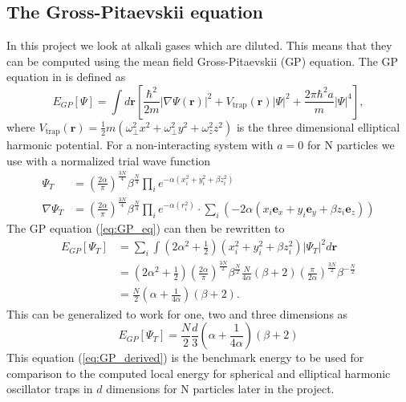 \documentclass[12pt,a4paper,english]{article}
\begin{document}
\subsection{The Gross-Pitaevskii equation}
\label{subsect:GP_eq}
In this project we look at alkali gases which are diluted. This means that they can be computed using the mean field Gross-Pitaevskii (GP) equation. The GP equation in \citet{dubois2001bose} is defined as
\begin{equation}
\label{eq:GP_eq}
E_{GP}[\Psi]=\int d\textbf{r}\left[\frac{\hbar^2}{2m}|\nabla\Psi(\textbf{r})|^2+V_{\text{trap}}(\textbf{r})|\Psi|^2+\frac{2\pi\hbar^2a}{m}|\Psi|^4\right],
\end{equation}
where $V_{\text{trap}}(\textbf{r})=\frac{1}{2}m(\omega_{\perp}^2x^2+\omega_{\perp}^2y^2+\omega_z^2z^2)$ is the three dimensional elliptical harmonic potential. For a non-interacting system with $a=0$ for N particles we use with a normalized trial wave function 
\begin{align}
\label{eq:norm_WF_T}
\Psi_T&=\left(\frac{2\alpha}{\pi}\right)^{\frac{3N}{4}}\beta^{\frac{N}{4}}\prod_{i}e^{-\alpha(x_i^2+y_i^2+\beta z_i^2)}\\
\nabla\Psi_T&=\left(\frac{2\alpha}{\pi}\right)^{\frac{3N}{4}}\beta^{\frac{N}{4}}\prod_{i}e^{-\alpha(r_i^2)}\cdot\sum_i(-2\alpha(x_i\textbf{e}_x+y_i\textbf{e}_y+\beta z_i\textbf{e}_z))
\end{align}
The GP equation (\ref{eq:GP_eq}) can then be rewritten to
\begin{align*}
E_{GP}[\Psi_T]&=\sum_i\int(2\alpha^2+\frac{1}{2})(x_i^2+y_i^2+\beta z_i^2)|\Psi_T|^2d\textbf{r}\nonumber\\
&=(2\alpha^2+\frac{1}{2})\left(\frac{2\alpha}{\pi}\right)^{\frac{3N}{2}}\beta^{\frac{N}{2}}\frac{N}{4\alpha}(\beta+2)\left(\frac{\pi}{2\alpha}\right)^{\frac{3N}{2}}\beta^{-\frac{N}{2}}\nonumber\\
&=\frac{N}{2}\left(\alpha+\frac{1}{4\alpha}\right)(\beta+2).
\end{align*}
This can be generalized to work for one, two and three dimensions as
\begin{equation}
\label{eq:GP_derived}
E_{GP}[\Psi_T]=\frac{N}{2}\frac{d}{3}\left(\alpha+\frac{1}{4\alpha}\right)(\beta+2)
\end{equation}
This equation (\ref{eq:GP_derived}) is the benchmark energy to be used for comparison to the computed local energy for spherical and elliptical harmonic oscillator traps in $d$ dimensions for N particles later in the project.
\end{document}
